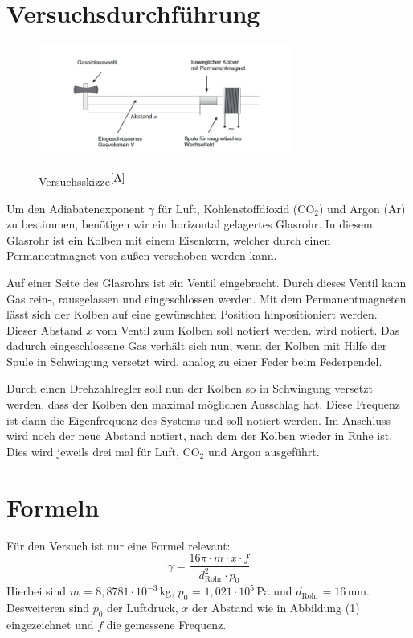 \documentclass[fontsize=12pt]{scrartcl}
\begin{document}
\section{Versuchsdurchführung}

\begin{figure}[H]
\centering
\includegraphics[width=0.75\textwidth]{Graphik/W43}
\label{43}
\caption{Versuchsskizze$^{\cite{A}}$}
\end{figure}

Um den Adiabatenexponent $\gamma$ für Luft, Kohlenstoffdioxid (CO$_2$) und Argon (Ar) zu bestimmen, benötigen wir ein horizontal gelagertes Glasrohr. In diesem Glasrohr ist ein Kolben mit einem Eisenkern, welcher durch einen Permanentmagnet von außen verschoben werden kann. \par

Auf einer Seite des Glasrohrs ist ein Ventil eingebracht. Durch dieses Ventil kann Gas rein-, rausgelassen und eingeschlossen werden.
Mit dem Permanentmagneten lässt sich der Kolben auf eine gewünschten Position hinpositioniert werden. Dieser Abstand $x$ vom Ventil zum Kolben soll notiert werden. wird notiert.
Das dadurch eingeschlossene Gas verhält sich nun, wenn der Kolben mit Hilfe der Spule in Schwingung versetzt wird,  analog zu einer Feder beim Federpendel.\par

Durch einen Drehzahlregler soll nun der Kolben so in Schwingung versetzt werden, dass der Kolben den maximal möglichen Ausschlag hat. 
Diese Frequenz ist dann die Eigenfrequenz des Systems und soll notiert werden. Im Anschluss wird noch der neue Abstand notiert, nach dem der Kolben wieder in Ruhe ist. Dies wird jeweils drei mal für Luft, CO$_2$ und Argon ausgeführt.


\noindent
\newpage


\section{Formeln}

Für den Versuch ist nur eine Formel relevant:
\begin{equation}
\gamma = \frac{16\pi \cdot m \cdot x \cdot f}{d_{\text{Rohr}}^2 \cdot p_0}
\label{1}
\end{equation}
Hierbei sind $m$ = $8,8781\cdot 10^{-3}$\,kg, $p_0$ = $1,021\cdot 10^{5}$\,Pa und $d_{\text{Rohr}}= 16$\,mm. Desweiteren sind $p_0$ der Luftdruck, $x$ der Abstand wie in Abbildung (1) eingezeichnet und $f$ die gemessene Frequenz.
\end{document}
